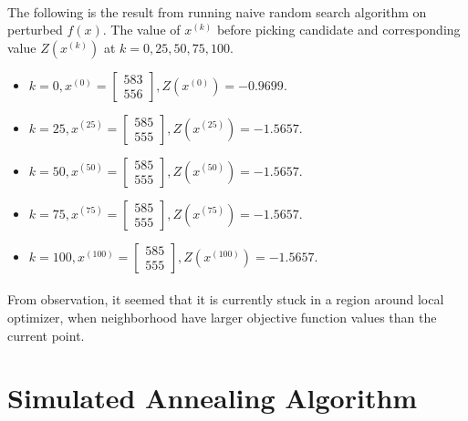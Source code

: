 \documentclass[a4paper]{article}
\begin{document}
\paragraph{}
The following is the result from running naive random search algorithm on perturbed $f(x)$. The value of $x^{(k)}$ before picking candidate and corresponding value $Z(x^{(k)})$ at $k = 0,25,50,75,100$.
\begin{itemize}
    \item $k = 0,   x^{(0)} = \begin{bmatrix} 583 \\ 556 \end{bmatrix}, Z(x^{(0)}) = -0.9699$.
    \item $k = 25,  x^{(25)} = \begin{bmatrix} 585 \\ 555 \end{bmatrix}, Z(x^{(25)}) = -1.5657$.
    \item $k = 50,  x^{(50)} = \begin{bmatrix} 585 \\ 555 \end{bmatrix}, Z(x^{(50)}) = -1.5657$.
    \item $k = 75,  x^{(75)} = \begin{bmatrix} 585 \\ 555 \end{bmatrix}, Z(x^{(75)}) = -1.5657$.
    \item $k = 100, x^{(100)} = \begin{bmatrix} 585 \\ 555 \end{bmatrix}, Z(x^{(100)}) = -1.5657$.
\end{itemize}
\paragraph{}
From observation, it seemed that it is currently stuck in a region around local optimizer, when neighborhood have larger objective function values than the current point.

\section{Simulated Annealing Algorithm}
\end{document}
